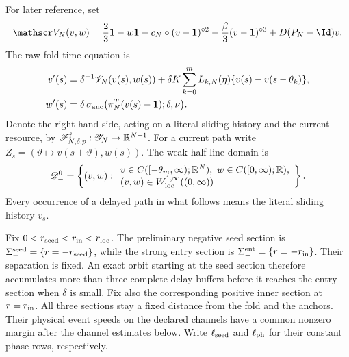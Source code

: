For later reference, set
\[
 \mathscr V_N(v,w)
 =\frac23\mathbf1-w\mathbf1
  -c_N\circ(v-\mathbf1)^{\circ2}
  -\frac\beta3(v-\mathbf1)^{\circ3}
  +D(P_N-\Id)v .
\]
The raw fold-time equation is
\begin{align}
 v'(s)
 &=\delta^{-1}\mathscr V_N(v(s),w(s))
   +\delta K\sum_{k=0}^mL_{k,N}(\eta)
       \{v(s)-v(s-\theta_k)\},\notag\\
 w'(s)
 &=\delta\,\sigma_{\rm anc}
       \bigl(\pi_N^T(v(s)-\mathbf1);\delta,\nu\bigr).
                                                               \label{eq:anchor-raw-fold-time-rfde}
\end{align}
Denote the right-hand side, acting on a literal sliding history and the
current resource, by
\(\mathscr F^{\rm f}_{N,\delta,p}:\mathscr Y_N\to\mathbb R^{N+1}\).
For a current path write
\(Z_s=(\vartheta\mapsto v(s+\vartheta),w(s))\).
The weak half-line domain is
\begin{equation}
 \mathscr D_-^0
 =\left\{(v,w):
 \begin{array}{l}
 v\in C([-\theta_m,\infty);\mathbb R^N),\
 w\in C([0,\infty);\mathbb R),\\
 (v,w)\in W^{1,\infty}_{\rm loc}((0,\infty))
 \end{array}\right\}.                                \label{eq:anchor-half-line-weak-domain}
\end{equation}
Every occurrence of a delayed path in what follows means the literal
sliding history \(v_s\).

Fix \(0<r_{\rm seed}<r_{\rm in}<r_{\rm loc}\).  The preliminary negative
seed section is
\(\Sigma_-^{\rm seed}=\{r=-r_{\rm seed}\}\), while the strong entry
section is \(\Sigma_-^{\rm ent}=\{r=-r_{\rm in}\}\).  Their separation is
fixed.  An exact orbit starting at the seed section therefore accumulates
more than three complete delay buffers before it reaches the entry section
when \(\delta\) is small.  Fix also the corresponding positive inner
section at \(r=r_{\rm in}\).  All three sections stay a fixed distance from
the fold and the anchors.  Their physical event speeds on the declared
channels have a common nonzero margin after the channel estimates below.
Write \(\ell_{\rm seed}\) and \(\ell_{\rm ph}\) for their constant phase
rows, respectively.

